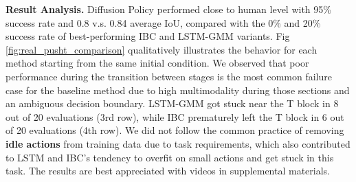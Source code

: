 


\textbf{Result Analysis.}
Diffusion Policy performed close to human level with 95\% success rate and 0.8 v.s. 0.84 average IoU, compared with the 0\% and 20\% success rate of best-performing IBC and LSTM-GMM variants. Fig \ref{fig:real_pusht_comparison} qualitatively illustrates the behavior for each method starting from the same initial condition. 
We observed that poor performance during the transition between stages is the most common failure case for the baseline method due to high multimodality during those sections and an ambiguous decision boundary. LSTM-GMM got stuck near the T block in 8 out of 20 evaluations (3rd row), while IBC prematurely left the T block in 6 out of 20 evaluations (4th row). 
We did not follow the common practice of removing \textbf{idle actions} from training data due to task requirements, which also contributed to LSTM and IBC's tendency to overfit on small actions and get stuck in this task. The results are best appreciated with videos in supplemental materials.

